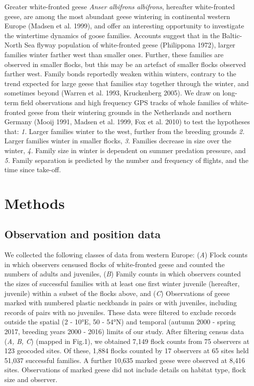 \documentclass[10pt,twocolumn]{paper}
\begin{document}
Greater white-fronted geese \emph{Anser albifrons albifrons}, hereafter
white-fronted geese, are among the most abundant geese wintering in
continental western Europe (Madsen et al. 1999), and offer an
interesting opportunity to investigate the wintertime dynamics of goose
families. Accounts suggest that in the Baltic-North Sea flyway
population of white-fronted geese (Philippona 1972), larger families
winter farther west than smaller ones. Further, these families are
observed in smaller flocks, but this may be an artefact of smaller
flocks observed farther west. Family bonds reportedly weaken within
winters, contrary to the trend expected for large geese that families
stay together through the winter, and sometimes beyond (Warren et al.
1993, Kruckenberg 2005). We draw on long-term field observations and
high frequency GPS tracks of whole families of white-fronted geese from
their wintering grounds in the Netherlands and northern Germany (Mooij
1991, Madsen et al. 1999, Fox et al. 2010) to test the hypotheses that:
\emph{1.} Larger families winter to the west, further from the breeding
grounds \emph{2.} Larger families winter in smaller flocks, \emph{3.}
Families decrease in size over the winter, \emph{4.} Family size in
winter is dependent on summer predation pressure, and \emph{5.} Family
separation is predicted by the number and frequency of flights, and the
time since take-off.

\section{Methods}\label{methods}

\subsection{Observation and position
data}\label{observation-and-position-data}

We collected the following classes of data from western Europe:
(\emph{A}) Flock counts in which observers censused flocks of
white-fronted geese and counted the numbers of adults and juveniles,
(\emph{B}) Family counts in which observers counted the sizes of
successful families with at least one first winter juvenile (hereafter,
juvenile) within a subset of the flocks above, and (\emph{C})
Observations of geese marked with numbered plastic neckbands in pairs or
with juveniles, including records of pairs with no juveniles. These data
were filtered to exclude records outside the spatial (2 - 10°E, 50 -
54°N) and temporal (autumn 2000 - spring 2017, breeding years 2000 -
2016) limits of our study. After filtering census data (\emph{A, B, C})
(mapped in Fig.1), we obtained 7,149 flock counts from 75 observers at
123 geocoded sites. Of these, 1,884 flocks counted by 17 observers at 65
sites held 51,037 successful families. A further 10,635 marked geese
were observed at 8,416 sites. Observations of marked geese did not
include details on habitat type, flock size and observer.
\end{document}
